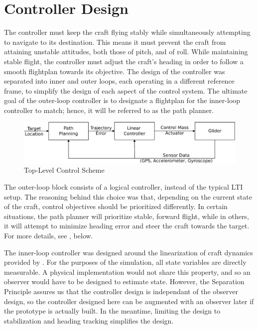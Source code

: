 \documentclass{sydeStyle}
\begin{document}
\section{Controller Design}
\label{sec:ctrldes}

The controller must keep the craft flying stably while simultaneously attempting
to navigate to its destination.  This means it must prevent the craft from
attaining unstable attitudes, both those of pitch, and of roll.  While
maintaining stable flight, the controller must adjust the craft's heading in
order to follow a smooth flightplan towards its objective.  The design of the
controller was separated into inner and outer loops, each operating in a
different reference frame, to simplify the design of each aspect of the control
system.  The ultimate goal of the outer-loop controller is to designate a
flightplan for the inner-loop controller to match; hence, it will be referred to
as the path planner.

\begin{figure}[h!]
    \centering
    \includegraphics[width=0.8\columnwidth]{figs/flowchart}
    \caption{Top-Level Control Scheme}
    \label{fig:flowchart}
\end{figure}

The outer-loop block consists of a logical controller, instead of the typical
LTI setup.  The reasoning behind this choice was that, depending on the current
state of the craft, control objectives should be prioritized differently.  In
certain situations, the path planner will prioritize stable, forward flight,
while in others, it will attempt to minimize heading error and steer the craft
towards the target.  For more details, see , below.

The inner-loop controller was designed around the linearization of craft
dynamics provided by \cite{spottiswoode}.  For the purposes of the simulation,
all state variables are directly measurable.  A physical implementation would
not share this property, and so an observer would have to be designed to
estimate state.  However, the Separation Principle assures us that the
controller design is independant of the observer design, so the controller
designed here can be augmented with an observer later if the prototype is
actually built.  In the meantime, limiting the design to stabilization and
heading tracking simplifies the design.
\end{document}
